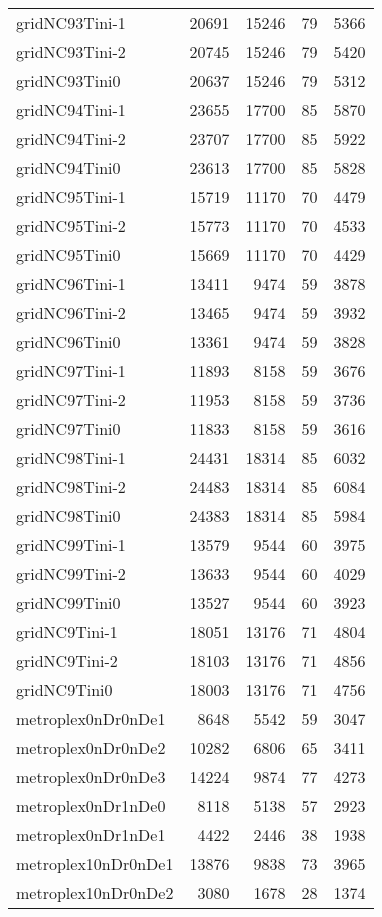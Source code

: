 \begin{longtable}{lrrrr}
gridNC93Tini-1 & 20691 & 15246 & 79 & 5366 \\
gridNC93Tini-2 & 20745 & 15246 & 79 & 5420 \\
gridNC93Tini0 & 20637 & 15246 & 79 & 5312 \\
gridNC94Tini-1 & 23655 & 17700 & 85 & 5870 \\
gridNC94Tini-2 & 23707 & 17700 & 85 & 5922 \\
gridNC94Tini0 & 23613 & 17700 & 85 & 5828 \\
gridNC95Tini-1 & 15719 & 11170 & 70 & 4479 \\
gridNC95Tini-2 & 15773 & 11170 & 70 & 4533 \\
gridNC95Tini0 & 15669 & 11170 & 70 & 4429 \\
gridNC96Tini-1 & 13411 & 9474 & 59 & 3878 \\
gridNC96Tini-2 & 13465 & 9474 & 59 & 3932 \\
gridNC96Tini0 & 13361 & 9474 & 59 & 3828 \\
gridNC97Tini-1 & 11893 & 8158 & 59 & 3676 \\
gridNC97Tini-2 & 11953 & 8158 & 59 & 3736 \\
gridNC97Tini0 & 11833 & 8158 & 59 & 3616 \\
gridNC98Tini-1 & 24431 & 18314 & 85 & 6032 \\
gridNC98Tini-2 & 24483 & 18314 & 85 & 6084 \\
gridNC98Tini0 & 24383 & 18314 & 85 & 5984 \\
gridNC99Tini-1 & 13579 & 9544 & 60 & 3975 \\
gridNC99Tini-2 & 13633 & 9544 & 60 & 4029 \\
gridNC99Tini0 & 13527 & 9544 & 60 & 3923 \\
gridNC9Tini-1 & 18051 & 13176 & 71 & 4804 \\
gridNC9Tini-2 & 18103 & 13176 & 71 & 4856 \\
gridNC9Tini0 & 18003 & 13176 & 71 & 4756 \\
metroplex0nDr0nDe1 & 8648 & 5542 & 59 & 3047 \\
metroplex0nDr0nDe2 & 10282 & 6806 & 65 & 3411 \\
metroplex0nDr0nDe3 & 14224 & 9874 & 77 & 4273 \\
metroplex0nDr1nDe0 & 8118 & 5138 & 57 & 2923 \\
metroplex0nDr1nDe1 & 4422 & 2446 & 38 & 1938 \\
metroplex10nDr0nDe1 & 13876 & 9838 & 73 & 3965 \\
metroplex10nDr0nDe2 & 3080 & 1678 & 28 & 1374 \\

\end{longtable}
